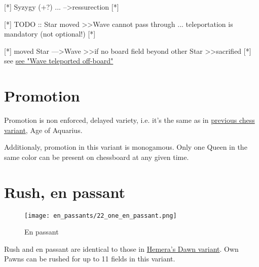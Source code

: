 \clearpage %

[*] Syzygy (+?) ... --\textgreater ressurection [*]

[*] TODO :: Star moved \textgreater\textgreater Wave cannot pass through ... teleportation is mandatory (not optional!) [*]

[*] moved Star ---\textgreater Wave \textgreater\textgreater if no board field beyond other Star \textgreater\textgreater sacrified [*]
see \hyperref[fig:scn_d_11_wave_teleported_off_board]{see "Wave teleported off-board"}

\clearpage %

\section*{Promotion}

Promotion is non enforced, delayed variety, i.e. it's the same as in
\hyperref[sec:Age of Aquarius/Promotion]{previous chess variant}, Age of Aquarius.

Additionaly, promotion in this variant is monogamous.
Only one Queen in the same color can be present on chessboard at any given time.

\clearpage %

\section*{Rush, en passant}

\vspace*{-1.2\baselineskip}
\noindent
\begin{figure}[!h]
\texttt{[image: en\_passants/22\_one\_en\_passant.png]}
\caption{En passant}
\label{fig:22_one_en_passant}
\end{figure}

Rush and en passant are identical to those in \hyperref[fig:14_hemera_s_dawn_en_passant]{Hemera's Dawn variant}.
Own Pawns can be rushed for up to 11 fields in this variant.

\clearpage %

